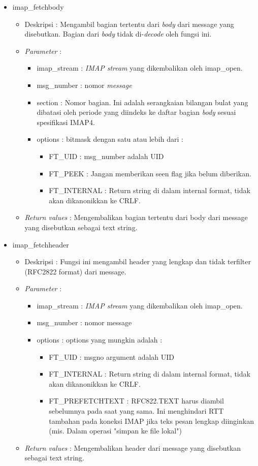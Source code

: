 \begin{itemize}
\item imap\_fetchbody
\begin{itemize}
\item Deskripsi : Mengambil bagian tertentu dari \textit{body} dari message yang disebutkan. Bagian dari \textit{body} tidak di-\textit{decode} oleh fungsi ini.
\item \textit{Parameter} :
\begin{itemize}
\item imap\_stream : \textit{IMAP stream} yang dikembalikan oleh imap\_open.
\item msg\_number : nomor \textit{message}
\item section : Nomor bagian. Ini adalah serangkaian bilangan bulat yang dibatasi oleh periode yang diindeks ke daftar bagian \textit{body} sesuai spesifikasi IMAP4.
\item options : bitmask dengan satu atau lebih dari :
\begin{itemize}
\item FT\_UID : msg\_number adalah UID
\item FT\_PEEK : Jangan memberikan seen flag jika belum diberikan.
\item FT\_INTERNAL : Return string di dalam internal format, tidak akan dikanonikkan ke CRLF.
\end{itemize}
\end{itemize}
\item \textit{Return values} : Mengembalikan bagian tertentu dari body dari message yang disebutkan sebagai text string.
\end{itemize}
 
\item imap\_fetchheader
\begin{itemize}
\item Deskripsi : Fungsi ini mengambil header yang lengkap dan tidak terfilter (RFC2822 format) dari message.
\item \textit{Parameter} :
\begin{itemize}
\item imap\_stream : \textit{IMAP stream} yang dikembalikan oleh imap\_open.
\item msg\_number : nomor message
\item options : options yang mungkin adalah :
\begin{itemize}
\item FT\_UID : msgno argument adalah UID
\item FT\_INTERNAL : Return string di dalam internal format, tidak akan dikanonikkan ke CRLF.
\item FT\_PREFETCHTEXT : RFC822.TEXT harus diambil sebelumnya pada saat yang sama. Ini menghindari RTT tambahan pada koneksi IMAP jika teks pesan lengkap diinginkan (mis. Dalam operasi "simpan ke file lokal")
\end{itemize}
\end{itemize}
\item \textit{Return values} : Mengembalikan header dari message yang disebutkan sebagai text string.
\end{itemize}


\end{itemize}
